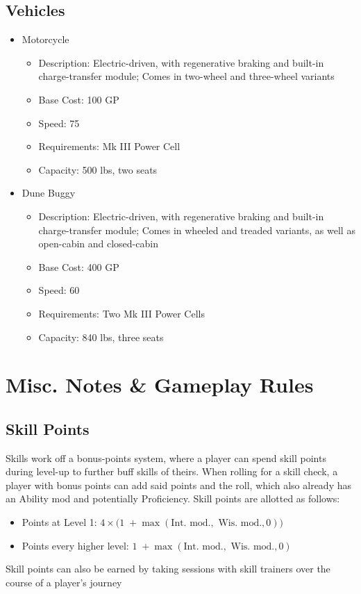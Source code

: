 \documentclass[12pt, landscape]{article}
\begin{document}
\begin{FlushLeft}
\begin{multicols}{2}
			\subsection{Vehicles}
			\begin{itemize}
				\item Motorcycle
				\begin{itemize}
					\item Description: Electric-driven, with regenerative braking and built-in charge-transfer module; Comes in two-wheel and three-wheel variants
					\item Base Cost: 100 GP
					\item Speed: 75
					\item Requirements: Mk III Power Cell
					\item Capacity: 500 lbs, two seats
				\end{itemize}
				\item Dune Buggy
				\begin{itemize}
					\item Description: Electric-driven, with regenerative braking and built-in charge-transfer module; Comes in wheeled and treaded variants, as well as open-cabin and closed-cabin
					\item Base Cost: 400 GP
					\item Speed: 60
					\item Requirements: Two Mk III Power Cells
					\item Capacity: 840 lbs, three seats
				\end{itemize}
			\end{itemize}
			\vfill \null \columnbreak

			\section{Misc. Notes \& Gameplay Rules}
			\subsection{Skill Points}
			Skills work off a bonus-points system, where a player can spend skill points during level-up to further buff skills of theirs.
			When rolling for a skill check, a player with bonus points can add said points and the roll, which also already has an Ability mod and potentially Proficiency.
			Skill points are allotted as follows:
			\begin{itemize}
				\item Points at Level 1: \linebreak $4 \times \big(1 \; + \max(\text{Int. mod.}, \text{ Wis. mod.}, 0)\big)$
				\item Points every higher level: \linebreak $1 \; + \max(\text{Int. mod.}, \text{ Wis. mod.}, 0)$
			\end{itemize}
			Skill points can also be earned by taking sessions with skill trainers over the course of a player's journey

\end{multicols}
\end{FlushLeft}
\end{document}
